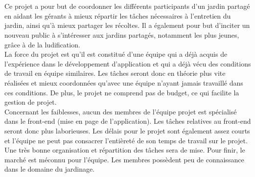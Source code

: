 \documentclass{report}
\begin{document}
    
    \section*{\color{orange}{\Large Finalités}}
    Ce projet a pour but de coordonner les différents participants d'un jardin partagé en aidant les gérants à mieux répartir les tâches nécessaires à l'entretien du jardin, ainsi qu'à mieux partager les récoltes. Il a également pour but d'inciter un nouveau public à s'intéresser aux jardins partagés, notamment les plus jeunes, grâce à de la ludification.\\
    
    La force du projet est qu'il est constitué d'une équipe qui a déjà acquis de l'expérience dans le développement d'application et qui a déjà vécu des conditions de travail en équipe similaires. Les tâches seront donc en théorie plus vite réalisées et mieux coordonnées qu'avec une équipe n'ayant jamais travaillé dans ces conditions. De plus, le projet ne comprend pas de budget, ce qui facilite la gestion de projet.\\
    Concernant les faiblesses, aucun des membres de l'équipe projet est spécialisé dans le front-end (mise en page de l'application). Les tâches relatives au front-end seront donc plus laborieuses. Les délais pour le projet sont également assez courts et l'équipe ne peut pas consacrer l'entièreté de son temps de travail sur le projet. Une très bonne organisation et répartition des tâches sera de mise. Pour finir, le marché est méconnu pour l'équipe. Les membres possèdent peu de connaissance dans le domaine du jardinage.\\
    
    
    
\end{document}
